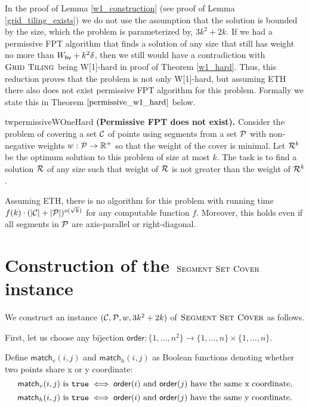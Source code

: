 In the proof of Lemma \ref{w1_construction}
(see proof of Lemma \ref{grid_tiling_exists})
we do not use the assumption that
the solution is bounded by the size,
which the problem is parameterized by, $3k^2+2k$.
If we had a permissive FPT algorithm
that finds a solution of any size that still
has weight no more than $W_{\mathsf{hv}}+k^2\delta$,
then we still would have a contradiction with $\textsc{Grid Tiling}$ being W[1]-hard
in proof of Theorem \ref{w1_hard}.
Thus, this reduction
proves that the problem is not only W[1]-hard, but assuming ETH 
there also does not exist permissive FPT algorithm for this problem.
Formally we state this in Theorem $\ref{permissive_w1_hard}$ below.


\begin{restatable}{tw}{permissiveWOneHard}
\label{permissive_w1_hard}
\textbf{(Permissive FPT does not exist).}
	Consider the problem of covering a set $\mathcal{C}$ of points
	using segments from a set $\mathcal{P}$ 
	with non-negative weights $w : \mathcal{P} \rightarrow \mathbb{R^+}$
	so that the weight of the cover is minimal.
	Let $\mathcal{R}^k$ be the
	optimum solution to this problem of size at most $k$.
	The task is to find a solution $\mathcal{R}$ of any size
	such that weight of $\mathcal{R}$ is not greater than the weight of $\mathcal{R}^k$.
	
	Assuming ETH, there is no algorithm for this
	problem with running time
	$f(k)\cdot(|\mathcal{C}| + |\mathcal{P}|)^{o(\sqrt{k})}$
	for any computable function $f$.
	Moreover, this holds even if all segments in $\mathcal{P}$
	are axis-parallel or right-diagonal.
\end{restatable}

\section{Construction of the $\textsc{Segment Set Cover}$ instance}
\newcommand{\order}{\mathsf{order}}
\newcommand{\matchv}{\mathsf{match}_v}
\newcommand{\matchh}{\mathsf{match}_h}

We construct an instance $(\mathcal{C}, \mathcal{P}, w, 3k^2+2k)$ of $\textsc{Segment Set Cover}$ as follows.

First, let us choose any bijection
$\order : \{1, \ldots, n^2\} \rightarrow \{1, \ldots, n\} \times \{1, \ldots, n\}$.


Define $\matchv(i, j)$ and $\matchh(i, j)$
as Boolean functions denoting whether two points share x or y coordinate:
$$\matchv(i, j) \text{ is } \true \iff
\order(i) \text{ and } \order(j) \text{ have the same x coordinate,}$$
$$\matchh(i, j) \text{ is } \true \iff
\order(i) \text{ and } \order(j) \text{ have the same y coordinate.}$$


